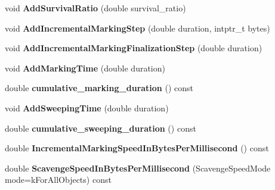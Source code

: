 \begin{DoxyCompactItemize}
\item 
void {\bfseries Add\+Survival\+Ratio} (double survival\+\_\+ratio)\hypertarget{classv8_1_1internal_1_1_g_c_tracer_a26a772bd4a6be905a7903adb61d3b755}{}\label{classv8_1_1internal_1_1_g_c_tracer_a26a772bd4a6be905a7903adb61d3b755}

\item 
void {\bfseries Add\+Incremental\+Marking\+Step} (double duration, intptr\+\_\+t bytes)\hypertarget{classv8_1_1internal_1_1_g_c_tracer_a41f36e7fa25cfcb9f7377ee3461f732d}{}\label{classv8_1_1internal_1_1_g_c_tracer_a41f36e7fa25cfcb9f7377ee3461f732d}

\item 
void {\bfseries Add\+Incremental\+Marking\+Finalization\+Step} (double duration)\hypertarget{classv8_1_1internal_1_1_g_c_tracer_a9ebcf975a5501e50f61ffd9abc7ff57a}{}\label{classv8_1_1internal_1_1_g_c_tracer_a9ebcf975a5501e50f61ffd9abc7ff57a}

\item 
void {\bfseries Add\+Marking\+Time} (double duration)\hypertarget{classv8_1_1internal_1_1_g_c_tracer_aab80d0e894aef91263b768faf495e157}{}\label{classv8_1_1internal_1_1_g_c_tracer_aab80d0e894aef91263b768faf495e157}

\item 
double {\bfseries cumulative\+\_\+marking\+\_\+duration} () const \hypertarget{classv8_1_1internal_1_1_g_c_tracer_adb7aab6ae19afe3bb0d103cbbfe9ce2d}{}\label{classv8_1_1internal_1_1_g_c_tracer_adb7aab6ae19afe3bb0d103cbbfe9ce2d}

\item 
void {\bfseries Add\+Sweeping\+Time} (double duration)\hypertarget{classv8_1_1internal_1_1_g_c_tracer_a1f83b6dd9c46253a15ac1784938e15fa}{}\label{classv8_1_1internal_1_1_g_c_tracer_a1f83b6dd9c46253a15ac1784938e15fa}

\item 
double {\bfseries cumulative\+\_\+sweeping\+\_\+duration} () const \hypertarget{classv8_1_1internal_1_1_g_c_tracer_a99f86cb68961603b332c435104b41fa5}{}\label{classv8_1_1internal_1_1_g_c_tracer_a99f86cb68961603b332c435104b41fa5}

\item 
double {\bfseries Incremental\+Marking\+Speed\+In\+Bytes\+Per\+Millisecond} () const \hypertarget{classv8_1_1internal_1_1_g_c_tracer_a5193960a10cd7899b8a52af8e411851f}{}\label{classv8_1_1internal_1_1_g_c_tracer_a5193960a10cd7899b8a52af8e411851f}

\item 
double {\bfseries Scavenge\+Speed\+In\+Bytes\+Per\+Millisecond} (Scavenge\+Speed\+Mode mode=k\+For\+All\+Objects) const \hypertarget{classv8_1_1internal_1_1_g_c_tracer_a751b08c5a0303361152e202e60355136}{}\label{classv8_1_1internal_1_1_g_c_tracer_a751b08c5a0303361152e202e60355136}


\end{DoxyCompactItemize}
